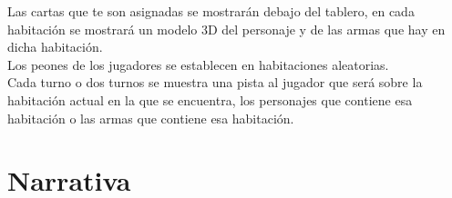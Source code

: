 Las cartas que te son asignadas se mostrarán debajo del tablero, en cada habitación se mostrará un modelo 3D del personaje y de las armas que hay en dicha habitación.\\

Los peones de los jugadores se establecen en habitaciones aleatorias.\\

Cada turno o dos turnos se muestra una pista al jugador que será sobre la habitación actual en la que se encuentra, los personajes que contiene esa habitación o las armas que contiene esa habitación.\\

\section{Narrativa}
